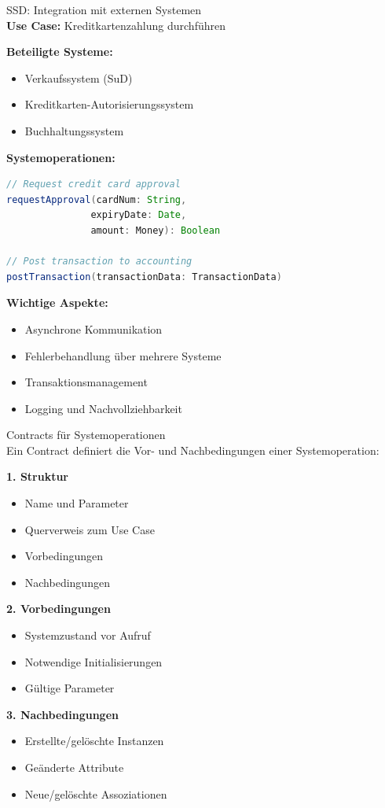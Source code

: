 \begin{example2}{SSD: Integration mit externen Systemen}\\
\textbf{Use Case:} Kreditkartenzahlung durchführen

\textbf{Beteiligte Systeme:}
\begin{itemize}
    \item Verkaufssystem (SuD)
    \item Kreditkarten-Autorisierungssystem
    \item Buchhaltungssystem
\end{itemize}

\textbf{Systemoperationen:}
\begin{lstlisting}[language=Java, style=base]
// Request credit card approval
requestApproval(cardNum: String, 
               expiryDate: Date, 
               amount: Money): Boolean

// Post transaction to accounting
postTransaction(transactionData: TransactionData)
\end{lstlisting}

\textbf{Wichtige Aspekte:}
\begin{itemize}
    \item Asynchrone Kommunikation
    \item Fehlerbehandlung über mehrere Systeme
    \item Transaktionsmanagement
    \item Logging und Nachvollziehbarkeit
\end{itemize}
\end{example2}

\begin{KR}{Contracts für Systemoperationen}\\
Ein Contract definiert die Vor- und Nachbedingungen einer Systemoperation:

\textbf{1. Struktur}
\begin{itemize}
    \item Name und Parameter
    \item Querverweis zum Use Case
    \item Vorbedingungen
    \item Nachbedingungen
\end{itemize}

\textbf{2. Vorbedingungen}
\begin{itemize}
    \item Systemzustand vor Aufruf
    \item Notwendige Initialisierungen
    \item Gültige Parameter
\end{itemize}

\textbf{3. Nachbedingungen}
\begin{itemize}
    \item Erstellte/gelöschte Instanzen
    \item Geänderte Attribute
    \item Neue/gelöschte Assoziationen
\end{itemize}
\end{KR}

